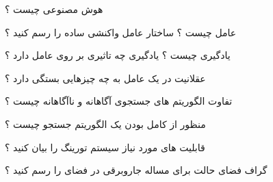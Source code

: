 \documentclass[12pt]{article}
\begin{document}
\noindent
هوش مصنوعی چیست ؟


\vspace{30pt}

\noindent
عامل چیست ؟ ساختار عامل واکنشی ساده را رسم کنید ؟



\vspace{30pt}

\noindent
یادگیری چیست ؟ یادگیری چه تاثیری بر روی عامل دارد ؟



\vspace{30pt}

\noindent
عقلانیت در یک عامل به چه چیزهایی بستگی دارد ؟



\vspace{30pt}

\noindent
تفاوت الگوریتم های جستجوی آگاهانه و ناآگاهانه چیست ؟



\vspace{30pt}

\noindent
منظور از کامل بودن یک الگوریتم جستجو چیست ؟



\vspace{30pt}

\noindent
قابلیت های مورد نیاز سیستم تورینگ را بیان کنید ؟



\vspace{30pt}

\noindent
گراف فضای حالت برای مساله جاروبرقی در فضای 
	\textbf{}
را رسم کنید ؟
\end{document}
